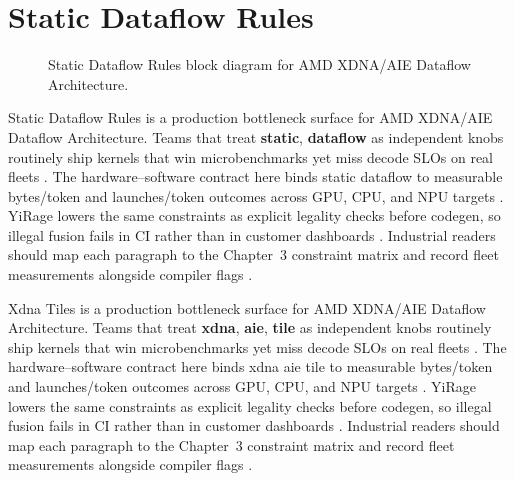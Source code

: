 \section{Static Dataflow Rules}
\label{sec:static_dataflow_rules}
\begin{figure}[t]
\centering
{}
\caption{Static Dataflow Rules block diagram for AMD XDNA/AIE Dataflow Architecture.}
\label{fig:static_dataflow_rules_architecture}
\end{figure}


Static Dataflow Rules is a production bottleneck surface for AMD XDNA/AIE Dataflow Architecture. Teams that treat \textbf{static}, \textbf{dataflow} as independent knobs routinely ship kernels that win microbenchmarks yet miss decode SLOs on real fleets \citep{taxbreak2026,semianalysis2024tma}. The hardware--software contract here binds static dataflow to measurable bytes/token and launches/token outcomes across GPU, CPU, and NPU targets \citep{memoryfloor2026,amd2024xdna}. YiRage lowers the same constraints as explicit legality checks before codegen, so illegal fusion fails in CI rather than in customer dashboards \citep{nvidia2022hopper,amd2024aie}. Industrial readers should map each paragraph to the Chapter~3 constraint matrix and record fleet measurements alongside compiler flags \citep{semianalysis2024tma,dlbook}.

Xdna Tiles is a production bottleneck surface for AMD XDNA/AIE Dataflow Architecture. Teams that treat \textbf{xdna}, \textbf{aie}, \textbf{tile} as independent knobs routinely ship kernels that win microbenchmarks yet miss decode SLOs on real fleets \citep{liu2024deepseekv3,memoryfloor2026}. The hardware--software contract here binds xdna aie tile to measurable bytes/token and launches/token outcomes across GPU, CPU, and NPU targets \citep{patel2025llminference,nvidia2022hopper}. YiRage lowers the same constraints as explicit legality checks before codegen, so illegal fusion fails in CI rather than in customer dashboards \citep{taxbreak2026,semianalysis2024tma}. Industrial readers should map each paragraph to the Chapter~3 constraint matrix and record fleet measurements alongside compiler flags \citep{memoryfloor2026,amd2024xdna}.

